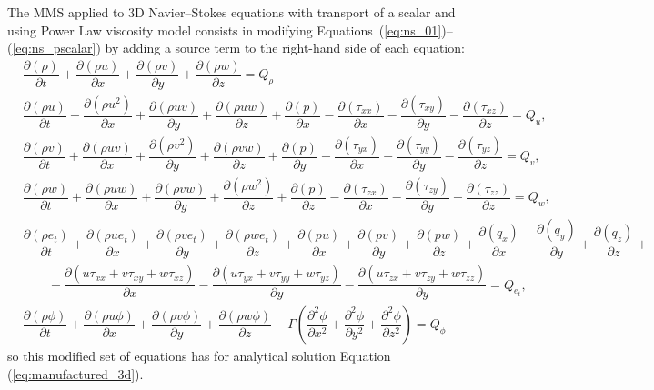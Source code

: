 \documentclass[10pt]{article}
\newcommand{\Diff}[2] {\dfrac{\partial( #1)}{\partial #2}}
\newcommand{\diff}[2] {\dfrac{\partial #1}{\partial #2}}
\begin{document}
The MMS applied to 3D Navier--Stokes equations with transport of a scalar and using Power Law viscosity model consists in modifying Equations~(\ref{eq:ns_01})--(\ref{eq:ns_pscalar}) by adding a source term to the right-hand side of each equation:
\begin{equation}
\begin{split}
\label{eq:ns_3d_mod}
&\Diff{\rho}{t} +\Diff{\rho u}{x}+\Diff{\rho v}{y} + \Diff{\rho w}{z} = Q_\rho\\
%
 &\Diff{\rho u}{t} +\Diff{\rho u^2 }{x}+\Diff{\rho uv}{y} +\Diff{\rho uw}{z} +\Diff{p}{x}-\Diff{\tau_{xx}}{x}-\Diff{\tau_{xy}}{y}-\Diff{\tau_{xz}}{z}= Q_u,\\
%
&\Diff{\rho v}{t} +\Diff{\rho uv }{x}+\Diff{\rho v^2}{y} +\Diff{\rho vw}{z}+\Diff{p}{y}-\Diff{\tau_{yx}}{x}-\Diff{\tau_{yy}}{y}-\Diff{\tau_{yz}}{z}= Q_v,\\
%
&\Diff{\rho w}{t} +\Diff{\rho  uw }{ x}+\Diff{\rho  vw }{ y}+\Diff{\rho w^2 }{ z}+\Diff{p}{z}-\Diff{\tau_{zx}}{x}-\Diff{\tau_{zy}}{y}-\Diff{\tau_{zz}}{z}=Q_w,\\
%
&\Diff{\rho e_t}{t} +\Diff{\rho u e_t}{x}+\Diff{\rho v e_t}{y}+\Diff{\rho we_t}{z}+\Diff{pu}{x}+\Diff{pv}{y}+\Diff{pw}{z} +\Diff{q_x}{x} +\Diff{q_y}{y} +\Diff{q_z}{z}+\\
    &\qquad-\Diff{u\tau_{xx}+v\tau_{xy}+w\tau_{xz}}{x}-\Diff{u\tau_{yx}+v\tau_{yy}+w\tau_{yz}}{y}-\Diff{u\tau_{zx}+v\tau_{zy}+w\tau_{zz}}{y}=Q_{e_t},\\
&\Diff{\rho\phi}{t} + \Diff{\rho u \phi}{x} + \Diff{\rho v \phi}{y} + \Diff{\rho w \phi}{z} - \Gamma \left( \diff{^2 \phi}{x^2} +\diff{^2 \phi}{y^2} + \diff{^2 \phi}{z^2} \right) = Q_{\phi}
\end{split}
\end{equation}
so this modified set of equations has for analytical solution Equation (\ref{eq:manufactured_3d}).
\end{document}
